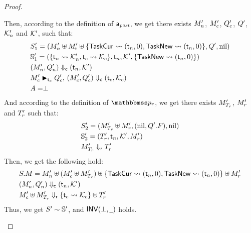 \begin{proof}
\begin{itemize}
            Then, according to the definition of $\mathsf{a}_{\textit{post}}$, 
            we get there exists $M_n'$, $M_c'$, 
            $Q_c'$, $Q'$, $\mathcal{K}_n'$ 
            and $\mathcal{K}'$, such that:
            \begin{align}
                & S_1' = 
                (M_n'\uplus M_{\textsf{t}}'\uplus
                    \{ \mathsf{TaskCur} \leadsto (\textsf{t}_n, 0), 
                    \mathsf{TaskNew} \leadsto (\textsf{t}_n, 0) \}, 
                Q', \text{nil}) \\
                & \mathbb{S}_1' = 
                (\{ \textsf{t}_n \leadsto \mathcal{K}_n', 
                    \textsf{t}_c \leadsto \mathcal{K}_c \}, \textsf{t}_n, 
                \mathcal{K}', \{ \mathsf{TaskNew} \leadsto (\textsf{t}_n, 0) \}) 
                \\
                & {(M_n', Q_n')} \Downarrow_{\textsf{c}} {(\textsf{t}_n, \mathcal{K}')}
                \\
                & {M_c'} \blacktriangleright_{\textsf{t}_c} {Q_c'}, \, 
                {(M_c', Q_c')} \Downarrow_{\textsf{c}} {(\textsf{t}_c, \mathcal{K}_c)} \\
                & \textit{A} = \perp
            \end{align}
            And according to the definition of $\relastP_r$, we get 
            there exists $M_{T_r}'$, $M_r'$ and 
            $T_r'$ such that:
            \begin{align}
                & S_2' = (M_{T_r}' \uplus M_r', 
                    (\text{nil}, Q'.F), \text{nil}) \\
                & \mathbb{S}_2' = (T_r', \textsf{t}_n, \mathcal{K}', M_r') \\
                & {M_{T_r}'} \Downarrow_{\textsf{r}} {T_r'}
            \end{align}  
            Then, we get the following hold:
            \begin{align}
                & S.M = 
                M_n'\uplus(M_c'\uplus M_{T_r}')\uplus
                \{ \mathsf{TaskCur} \leadsto (\textsf{t}_n, 0), 
                \mathsf{TaskNew} \leadsto (\textsf{t}_n, 0) \} \uplus
                M_r' \\
                & {(M_n', Q_n')} \Downarrow_{\textsf{c}} {(\textsf{t}_n, \mathcal{K}')} \\
                & {M_c'\uplus M_{T_r}'} \Downarrow_{\textsf{r}} {\{ \textsf{t}_c \leadsto \mathcal{K}_c \}\uplus T_r'}
            \end{align}
            Thus, we get ${S'} \sim {\mathbb{S}'}$, and 
            $\textsf{INV}{(\perp, \underline{\ \,})}$ holds. 
    \end{itemize}
\end{proof}

